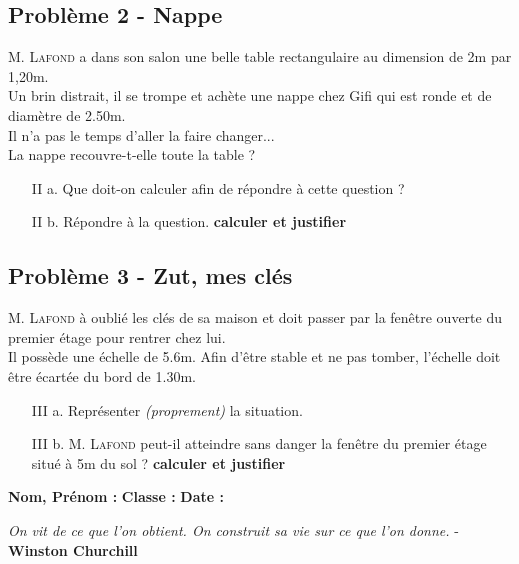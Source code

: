 \documentclass[12pt]{article}
\begin{document}
\subsection*{Problème 2 - Nappe}

\textsc{M. Lafond} a dans son salon une belle table rectangulaire au dimension de 2m par 1,20m. \\
Un brin distrait, il se trompe et achète une nappe chez Gifi qui est ronde et de diamètre de 2.50m. \\
Il n'a pas le temps d'aller la faire changer... \\
La nappe recouvre-t-elle toute la table ?

\begin{enumerate}
  \item[II a.] Que doit-on calculer afin de répondre à cette question ?

  \item[II b.] Répondre à la question. \textbf{calculer et justifier}
\end{enumerate}

\subsection*{Problème 3 - Zut, mes clés}

\textsc{M. Lafond} à oublié les clés de sa maison et doit passer par la fenêtre ouverte du premier étage pour rentrer chez lui. \\
Il possède une échelle de 5.6m. Afin d'être stable et ne pas tomber, l'échelle doit être écartée du bord de 1.30m. 

\begin{enumerate}
\item[III a.] Représenter \textit{(proprement)} la situation.

\item[III b.] \textsc{M. Lafond} peut-il atteindre sans danger la fenêtre du premier étage situé à 5m du sol ?  \textbf{calculer et justifier}
\end{enumerate}

\newpage


\textbf{Nom, Prénom :} \hspace{8cm} \textbf{Classe :} \hspace{3cm} \textbf{Date :}\\
\vspace{-0.2cm}
\begin{center}
  \textit{On vit de ce que l’on obtient. On construit sa vie sur ce que l’on donne.}  - \textbf{Winston Churchill}
\end{center}
\vspace{-0.2cm}
\end{document}
